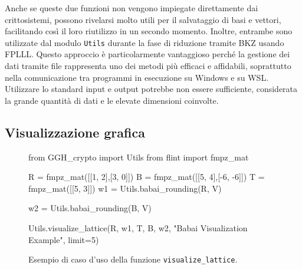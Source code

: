 Anche se queste due funzioni non vengono impiegate direttamente dai crittosistemi, 
possono rivelarsi molto utili per il salvataggio di basi e vettori, facilitando così il 
loro riutilizzo in un secondo momento. Inoltre, entrambe sono utilizzate dal modulo 
\texttt{Utils} durante la fase di riduzione tramite BKZ usando FPLLL. Questo approccio è particolarmente 
vantaggioso perché la gestione dei dati tramite file rappresenta uno dei metodi più 
efficaci e affidabili, soprattutto nella comunicazione tra programmi in esecuzione su Windows e su
WSL. Utilizzare lo standard input e output potrebbe non essere 
sufficiente, considerata la grande quantità di dati e le elevate dimensioni coinvolte.

\subsection{Visualizzazione grafica}

\begin{figure}[h]
    \begin{python}
        from GGH_crypto import Utils
        from flint import fmpz_mat

        R = fmpz_mat([[1, 2],[3, 0]])
        B = fmpz_mat([[5, 4],[-6, -6]])
        T = fmpz_mat([[5, 3]])
        w1 = Utils.babai_rounding(R, V)

        w2 = Utils.babai_rounding(B, V)

        Utils.visualize_lattice(R, w1, T, B, w2, 
                        "Babai Visualization Example", limit=5)
    \end{python}
    \caption{Esempio di caso d'uso della funzione \texttt{visualize\_lattice}.}
    \label{fig:babaivisualizationcode}
\end{figure}

